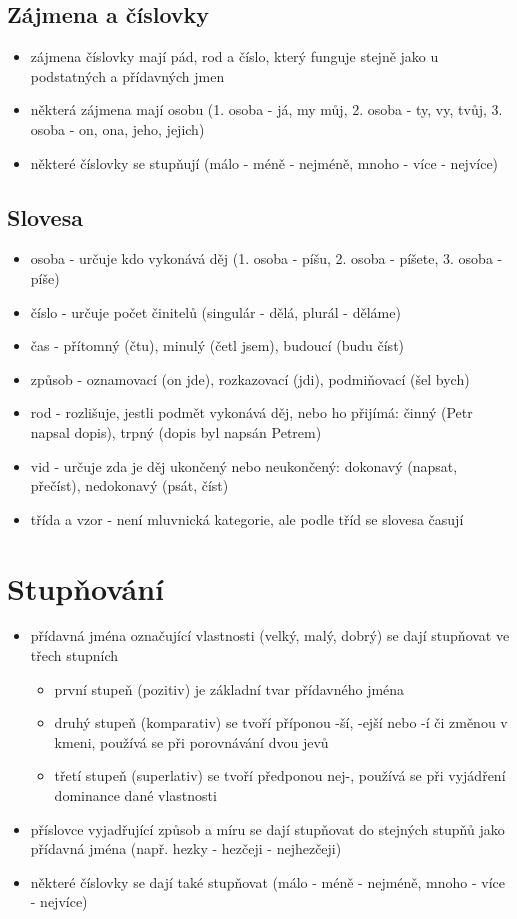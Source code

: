 \documentclass{memoir}
\begin{document}
	\subsection*{Zájmena a číslovky}
		\begin{itemize}
			\item zájmena číslovky mají pád, rod a číslo, který funguje stejně jako u podstatných a přídavných jmen
			\item některá zájmena mají osobu (1. osoba - já, my můj, 2. osoba - ty, vy, tvůj, 3. osoba - on, ona, jeho, jejich)
			\item některé číslovky se stupňují (málo - méně - nejméně, mnoho - více - nejvíce)
		\end{itemize}
	\subsection*{Slovesa}
		\begin{itemize}
			\item osoba - určuje kdo vykonává děj (1. osoba - píšu, 2. osoba - píšete, 3. osoba - píše)
			\item číslo - určuje počet činitelů (singulár - dělá, plurál - děláme)
			\item čas - přítomný (čtu), minulý (četl jsem), budoucí (budu číst)
			\item způsob - oznamovací (on jde), rozkazovací (jdi), podmiňovací (šel bych)
			\item rod - rozlišuje, jestli podmět vykonává děj, nebo ho přijímá: činný (Petr napsal dopis), trpný (dopis byl napsán Petrem)
			\item vid - určuje zda je děj ukončený nebo neukončený: dokonavý (napsat, přečíst), nedokonavý (psát, číst)
			\item třída a vzor - není mluvnická kategorie, ale podle tříd se slovesa časují 
		\end{itemize}

\section*{Stupňování}
	\begin{itemize}
		\item přídavná jména označující vlastnosti (velký, malý, dobrý) se dají stupňovat ve třech stupních
		\begin{itemize}
			\item první stupeň (pozitiv) je základní tvar přídavného jména
			\item druhý stupeň (komparativ) se tvoří příponou -ší, -ejší nebo -í či změnou v kmeni, používá se při porovnávání dvou jevů
			\item třetí stupeň (superlativ) se tvoří předponou nej-, používá se při vyjádření dominance dané vlastnosti
		\end{itemize}
		\item příslovce vyjadřující způsob a míru se dají stupňovat do stejných stupňů jako přídavná jména (např. hezky - hezčeji - nejhezčeji)
		\item některé číslovky se dají také stupňovat (málo - méně - nejméně, mnoho - více - nejvíce)
	\end{itemize}
\end{document}
